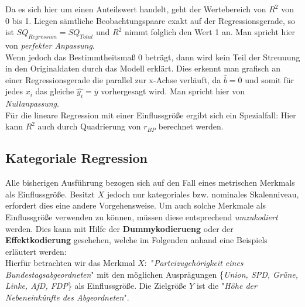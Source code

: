 \documentclass[a4paper]{article}
\newcommand\dangersign{%
 \makebox[1.8em][c]{%
 \makebox[0pt][c]{\raisebox{.15em}{\small!}}%
 \makebox[0pt][c]{\color{red}\Large$\triangle$}}}%
\begin{document}
\noindent Da es sich hier um einen Anteilswert handelt, geht der Wertebereich von $R^2$ von 0 bis 1.
Liegen sämtliche Beobachtungspaare exakt auf der Regressionsgerade, so ist $SQ_{Regression} = SQ_{Total}$ und $R^2$ nimmt folglich den Wert 1 an. Man spricht hier von \textit{perfekter Anpassung}.\\
Wenn jedoch das Bestimmtheitsmaß 0 beträgt, dann wird kein Teil der Streuuung in den Originaldaten durch das Modell erklärt. Dies erkennt man grafisch an einer Regressionsgerade die parallel zur x-Achse verläuft, da $\hat{b}=0$ und somit für jedes $x_i$ das gleiche $\hat{y_i} = \bar y$ vorhergesagt wird. Man spricht hier von \textit{Nullanpassung}.\\

\noindent \dangersign Für die lineare Regression mit einer Einflussgröße ergibt sich ein Spezialfall: Hier kann $R^2$ auch durch Quadrierung von $r_{BP}$ berechnet werden.

\subsection{Kategoriale Regression} \label{sec:kat-reg}
Alle bisherigen Ausführung bezogen sich auf den Fall eines metrischen Merkmals als Einflussgröße. Besitzt $X$ jedoch nur kategoriales bzw. nominales Skalenniveau, erfordert dies eine andere Vorgehensweise. Um auch solche Merkmale als Einflussgröße verwenden zu können, müssen diese entsprechend \textit{umzukodiert} werden. Dies kann mit Hilfe der \textbf{Dummykodierueng} oder der \textbf{Effektkodierung} geschehen, welche im Folgenden anhand eine Beispiels erläutert werden:\\

\noindent Hierfür betrachten wir das Merkmal $X:$ "\textit{Parteizugehörigkeit eines Bundestagsabgeordneten}" mit den möglichen Ausprägungen \{\textit{Union, SPD, Grüne, Linke, AfD, FDP}\} als Einflussgröße. Die Zielgröße $Y$ ist die "\textit{Höhe der Nebeneinkünfte des Abgeordneten}".\\
\end{document}
